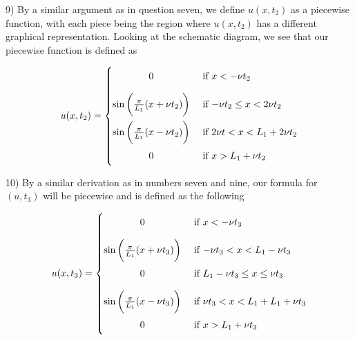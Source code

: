 \documentclass[executivepaper]{article}
\begin{document}
\begin{flushleft}

9) By a similar argument as in question seven, we define $u(x,t_{2})$ as a piecewise function, with each piece being the region where $u(x,t_{2})$ has a different graphical representation. Looking at the schematic diagram, we see that our piecewise function is defined as

\pagebreak

\vspace*{-40mm}

\begin{center}

\[
 u(x,t_{2})=
  \begin{cases}
      \hfill 0  \hfill & \text{ if $x < -\nu t_{2}$} \\[1em]
      
      \hfill \sin\bigg(\frac{\pi}{L_{1}} (x+\nu t_{2})\bigg) \hfill & \text{ if $-\nu t_{2} \leq x < 2\nu t_{2}$} \\[1em]
      
      \hfill \sin\bigg(\frac{\pi}{L_{1}} (x-\nu t_{2})\bigg) \hfill & \text{ if $2\nu t < x < L_{1}+2\nu t_{2}$} \\[1em]
      
      \hfill 0 \hfill & \text{ if $x > L_{1}+\nu t_{2}$}
  \end{cases}
\]

\end{center}

\end{flushleft}

\begin{flushleft}

10) By a similar derivation as in numbers seven and nine, our formula for $(u,t_{3})$ will be piecewise and is defined as the following

\begin{center}

\[
 u(x,t_{3})=
  \begin{cases}
      \hfill 0  \hfill & \text{ if $x < -\nu t_{3}$} \\[1em]
      
      \hfill \sin\bigg(\frac{\pi}{L_{1}} (x+\nu t_{3})\bigg) \hfill & \text{ if $-\nu t_{3} < x < L_{1}-\nu t_{3}$} \\[1em]
      
      \hfill 0  \hfill & \text{ if $L_{1}-\nu t_{3} \leq x \leq \nu t_{3}$} \\[1em]
      
      \hfill \sin\bigg(\frac{\pi}{L_{1}} (x-\nu t_{3})\bigg) \hfill & \text{ if $\nu t_{3} < x < L_{1}+L_{1}+\nu t_{3}$} \\[1em]
      
      \hfill 0 \hfill & \text{ if $x > L_{1}+\nu t_{3}$}
  \end{cases}
\]

\end{center}

\end{flushleft}
\end{document}
